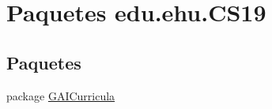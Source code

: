 \hypertarget{a00020}{}\section{Paquetes edu.\+ehu.\+C\+S19}
\label{a00020}
\subsection*{Paquetes}
\begin{DoxyCompactItemize}
\item 
package \mbox{\hyperlink{a00017}{G\+A\+I\+Curricula}}
\end{DoxyCompactItemize}
